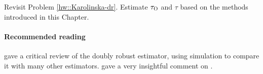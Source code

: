 Revisit Problem \ref{hw::Karolinska-dr}. Estimate $\tau_\textsc{O}$ and $\tau$ based on the methods introduced in this Chapter. 


 
 


 \paragraph{Recommended reading}
\citet{kang2007demystifying} gave a critical review of the doubly robust estimator, using simulation to compare it with many other estimators. \citet{robins2007comment} gave a very insightful comment on \citet{kang2007demystifying}.   
 
 
 

